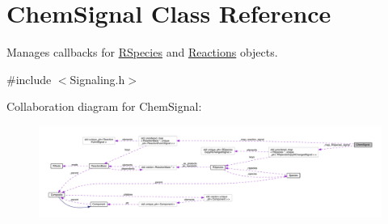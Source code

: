 \hypertarget{classChemSignal}{\section{Chem\+Signal Class Reference}
\label{classChemSignal}
}


Manages callbacks for \hyperlink{classRSpecies}{R\+Species} and \hyperlink{classReaction}{Reactions} objects.  




{\ttfamily \#include $<$Signaling.\+h$>$}



Collaboration diagram for Chem\+Signal\+:
\nopagebreak
\begin{figure}[H]
\begin{center}
\leavevmode
\includegraphics[width=350pt]{classChemSignal__coll__graph}
\end{center}
\end{figure}
